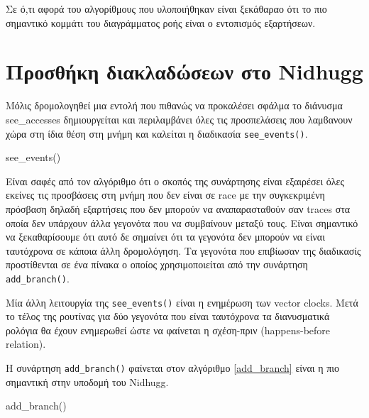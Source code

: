 Σε ό,τι αφορά του αλγορίθμους που υλοποιήθηκαν είναι ξεκάθαραο ότι το πιο σημαντικό κομμάτι του διαγράμματος ροής είναι ο εντοπισμός εξαρτήσεων.


\section{Προσθήκη διακλαδώσεων στο Nidhugg}

Μόλις δρομολογηθεί μια εντολή που πιθανώς να προκαλέσει σφάλμα το διάνυσμα see\_accesses δημιουργείται και περιλαμβάνει όλες τις προσπελάσεις 
που λαμϐανουν χώρα στη ίδια θέση στη μνήμη και καλείται η διαδικασία \verb|see_events()|.

\begin{algorithm}
    \caption{see\_events()}
\end{algorithm}

Είναι σαφές από τον αλγόριθμο ότι ο σκοπός της συνάρτησης είναι εξαιρέσει όλες εκείνες τις προσβάσεις στη μνήμη που δεν είναι σε
race με την συγκεκριμένη πρόσβαση δηλαδή εξαρτήσεις που δεν μπορούν να αναπαρασταθούν
σαν traces στα οποία δεν υπάρχουν άλλα γεγονότα που να συμβαίνουν μεταξύ τους.
Είναι σημαντικό να ξεκαθαρίσουμε ότι αυτό δε σημαίνει ότι τα γεγονότα δεν μπορούν να είναι ταυτόχρονα σε κάποια άλλη δρομολόγηση.
Τα γεγονότα που επιβίωσαν της διαδικασίς προστίθενται σε ένα πίνακα ο οποίος χρησιμοποιείται από την συνάρτηση \verb|add_branch()|.

Μία άλλη λειτουργία της \verb|see_events()| είναι η ενημέρωση των vector clocks. Μετά το τέλος της ρουτίνας για δύο γεγονότα που είναι ταυτόχρονα
τα διανυσματικά ρολόγια θα έχουν ενημερωθεί ώστε να φαίνεται η σχέση-πριν (happens-before relation).

H συνάρτηση \verb|add_branch()| φαίνεται στον αλγόριθμο \ref{add_branch} είναι η πιο σημαντική στην υποδομή του Nidhugg.

\begin{algorithm}
    \caption{add\_branch()}
    \label{add_branch}
\end{algorithm}

